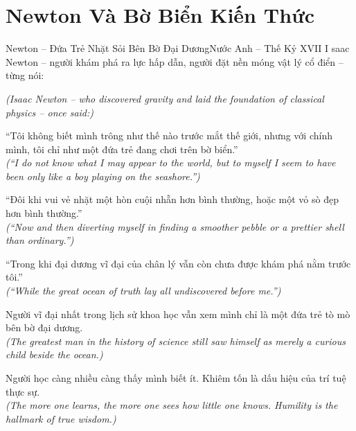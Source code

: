 \section{Newton Và Bờ Biển Kiến Thức}
\begin{truyen}{Newton -- Đứa Trẻ Nhặt Sỏi Bên Bờ Đại Dương}{Nước Anh -- Thế Kỷ XVII}
I saac Newton -- người khám phá ra lực hấp dẫn, người đặt nền móng vật lý cổ điển -- từng nói:

\textit{(Isaac Newton -- who discovered gravity and laid the foundation of classical physics -- once said:)}

``Tôi không biết mình trông như thế nào trước mắt thế giới, nhưng với chính mình, tôi chỉ như một đứa trẻ đang chơi trên bờ biển.''\\
\textit{(``I do not know what I may appear to the world, but to myself I seem to have been only like a boy playing on the seashore.'')}

``Đôi khi vui vẻ nhặt một hòn cuội nhẵn hơn bình thường, hoặc một vỏ sò đẹp hơn bình thường.''\\
\textit{(``Now and then diverting myself in finding a smoother pebble or a prettier shell than ordinary.'')}

``Trong khi đại dương vĩ đại của chân lý vẫn còn chưa được khám phá nằm trước tôi.''\\
\textit{(``While the great ocean of truth lay all undiscovered before me.'')}

Người vĩ đại nhất trong lịch sử khoa học vẫn xem mình chỉ là một đứa trẻ tò mò bên bờ đại dương.\\
\textit{(The greatest man in the history of science still saw himself as merely a curious child beside the ocean.)}

\end{truyen}
\begin{baihoc}
  Người học càng nhiều càng thấy mình biết ít. Khiêm tốn là dấu hiệu của trí tuệ thực sự.\\
  \textit{(The more one learns, the more one sees how little one knows. Humility is the hallmark of true wisdom.)}
\end{baihoc}

